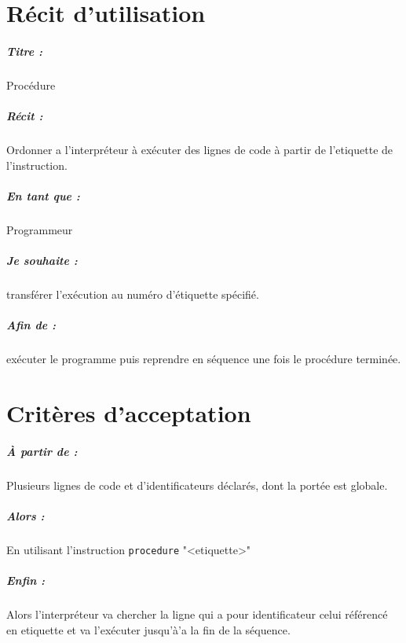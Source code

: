 \documentclass[12pt,a5paper, notitle, oneside]{report}
\begin{document}
	
	\chapter*{Récit d'utilisation}
	
	\paragraph{Titre : } Procédure
	\paragraph{Récit : } Ordonner a l'interpréteur à exécuter des lignes
						 de code à partir de l'etiquette de l'instruction.
	\paragraph{En tant que : } Programmeur
	\paragraph{Je souhaite : } transférer l'exécution au numéro d'étiquette spécifié.
	\paragraph{Afin de : } exécuter le programme puis reprendre en séquence une fois le procédure terminée.
	\newpage
	
	\chapter*{Critères d'acceptation}
	
	\paragraph{À partir de : } Plusieurs lignes de code et d'identificateurs déclarés, dont la portée est globale.
	
	\paragraph{Alors : } En utilisant l'instruction \verb|procedure| "<etiquette>"
	
	\paragraph{Enfin : } Alors l'interpréteur va chercher la ligne qui a pour identificateur celui référencé
						 en etiquette et va l'exécuter jusqu'à'a la fin de la séquence.
	
\end{document}
